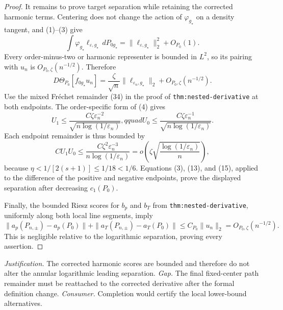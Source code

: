 \documentclass{article}
\begin{document}
\begin{proof}
It remains to prove target separation while retaining the corrected harmonic terms.  Centering does not change the action of \(\varphi_{g_\star}\) on a density tangent, and (1)--(3) give
\[
 \int\varphi_{g_\star}\ell_{\varepsilon,g_\star}\,dP_{0g_\star}
 =\|\ell_{\varepsilon,g_\star}\|_2^2+O_{P_0}(1).                    \tag{12}
\]
Every order-minus-two or harmonic representer is bounded in \(L^2\), so its pairing with \(u_n\) is \(O_{P_0,\zeta}(n^{-1/2})\).  Therefore
\[
 D\Theta_{P_0}[f_{0g_\star}u_n]
 =\frac{\zeta}{\sqrt n}\|\ell_{\varepsilon_n,g_\star}\|_2
 +O_{P_0,\zeta}(n^{-1/2}).                                             \tag{13}
\]
Use the mixed Fr\'echet remainder (34) in the proof of \texttt{thm:nested-derivative} at both endpoints.  The order-specific form of (4) gives
\[
 U_1\leq\frac{C\zeta\varepsilon_n^{-2}}
 {\sqrt{n\log(1/\varepsilon_n)}},qquad
 U_0\leq\frac{C\zeta\varepsilon_n^{-1}}
 {\sqrt{n\log(1/\varepsilon_n)}}.                                    \tag{14}
\]
Each endpoint remainder is thus bounded by
\[
 CU_1U_0\leq
 \frac{C\zeta^2\varepsilon_n^{-3}}
 {n\log(1/\varepsilon_n)}
 =o\!\left(\zeta\sqrt{\frac{\log(1/\varepsilon_n)}n}\right),        \tag{15}
\]
because \(\eta<1/[2(s+1)]\leq1/18<1/6\).  Equations (3), (13), and (15), applied to the difference of the positive and negative endpoints, prove the displayed separation after decreasing \(c_1(P_0)\).

Finally, the bounded Riesz scores for \(b_p\) and \(b_T\) from \texttt{thm:nested-derivative}, uniformly along both local line segments, imply
\[
 \|a_p(P_{n,\pm})-a_p(P_0)\|+
 \|a_T(P_{n,\pm})-a_T(P_0)\|
 \leq C_{P_0}\|u_n\|_2=O_{P_0,\zeta}(n^{-1/2}).                      \tag{16}
\]
This is negligible relative to the logarithmic separation, proving every assertion.
\end{proof}
\par\smallskip\noindent \textit{Justification.} The corrected harmonic scores are bounded and therefore do not alter the annular logarithmic leading separation. \textit{Gap.} The final fixed-center path remainder must be reattached to the corrected derivative after the formal definition change. \textit{Consumer.} Completion would certify the local lower-bound alternatives.
\end{document}
